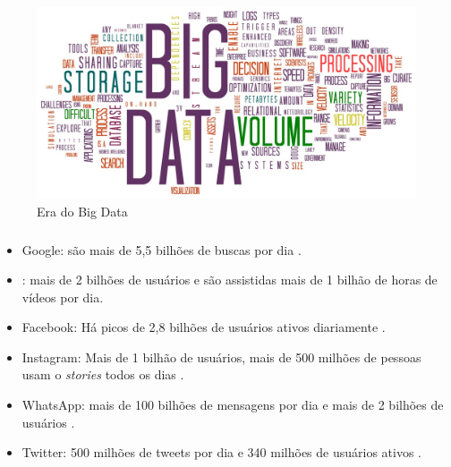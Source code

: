 \documentclass[12pt]{beamer}
\begin{document}
\begin{frame}{}
\frametitle{}
\begin{block}{}
\justifying
\begin{figure}[H]
    \centering
    \caption{Era do Big Data}
    \includegraphics[scale=0.3]{figs/BigData.jpg}
  \end{figure}
\end{block}
\end{frame}

\begin{frame}{}
\frametitle{}
\begin{block}{}
\justifying
\begin{itemize}
\item Google: são mais de 5,5 bilhões de buscas por dia \cite{ardorseo}.\pause
\item \citet{youtube}: mais de 2 bilhões de usuários e são assistidas mais de 1 bilhão de horas de vídeos por dia.\pause
\item Facebook: Há picos de 2,8 bilhões de usuários ativos diariamente \cite{internetstats}.\pause
\item Instagram: Mais de 1 bilhão de usuários, mais de 500 milhões de pessoas usam o \textit{stories} todos os dias \cite{InstagramStats}.\pause
\item WhatsApp: mais de 100 bilhões de mensagens por dia e mais de 2 bilhões de usuários \cite{WhatsappStats}.\pause
\item Twitter: 500 milhões de tweets por dia e 340 milhões de usuários ativos \cite{TwitterStats}.
\end{itemize}
\end{block}
\end{frame}
\end{document}

